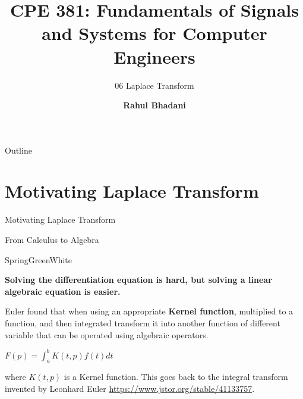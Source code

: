 \documentclass[aspectratio=169,xcolor=dvipsnames,svgnames,x11names,fleqn]{beamer}
\title[CPE 381: Signals and Systems]{CPE 381: Fundamentals of Signals and Systems for Computer Engineers} %
\subtitle{06 Laplace Transform}
\author[Rahul Bhadani] {{\Large \textbf{Rahul Bhadani}}}
\institute[UAH] %
{
    Electrical \& Computer Engineering,  The University of Alabama in Huntsville
}
\date
\begin{document}
\begin{frame}
\titlepage
\end{frame}

\begin{frame}{Outline}
    \tableofcontents
\end{frame}


\section{Motivating Laplace Transform}


\begin{frame}{}
    \begin{center}
    \Huge \bf \color{DarkBlue}
    \faFire
    
    Motivating Laplace Transform

\end{center}
\end{frame}

\begin{frame}{From Calculus to Algebra}

\begin{graddash}{SpringGreen}{White}
\begin{center}
    \textbf{Solving the differentiation equation is hard, but solving a linear algebraic equation is easier.}
\end{center}

\end{graddash}



Euler found that when using an appropriate \textbf{Kernel function}, multiplied to a function, and then integrated transform it into another function of different variable that can be operated using algebraic operators.

\Large
\begin{gradred}
\begin{center}
     $F(p) = \int_a^b K(t, p)f(t) dt$
\end{center}
   
\end{gradred}

\normalsize

where $K(t,p)$ is a Kernel function. This goes back to the integral transform invented by Leonhard Euler \url{https://www.jstor.org/stable/41133757}.



    
\end{frame}
\end{document}
